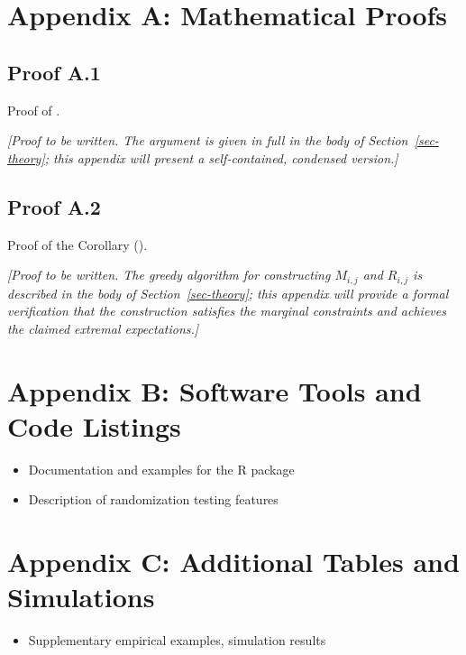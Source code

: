 \documentclass[
  12pt,
]{article}
\providecommand{\tightlist}{%
  \setlength{\itemsep}{0pt}\setlength{\parskip}{0pt}}
\theoremstyle{plain}
\theoremstyle{definition}
\theoremstyle{remark}
\begin{document}
\printbibliography[heading=none]

\newpage

\appendix

\section{Appendix A: Mathematical
Proofs}\label{appendix-a-mathematical-proofs}

\subsection{Proof A.1}\label{proof-max-product}

Proof of \textcite{prop-max-product}.

\emph{{[}Proof to be written. The argument is given in full in the body
of Section~\ref{sec-theory}; this appendix will present a
self-contained, condensed version.{]}}

\subsection{Proof A.2}\label{proof-cor-min}

Proof of the Corollary (\textcite{corr-min}).

\emph{{[}Proof to be written. The greedy algorithm for constructing
\(M_{i,j}\) and \(R_{i,j}\) is described in the body of
Section~\ref{sec-theory}; this appendix will provide a formal
verification that the construction satisfies the marginal constraints
and achieves the claimed extremal expectations.{]}}

\section{Appendix B: Software Tools and Code
Listings}\label{appendix-b-software-tools-and-code-listings}

\begin{itemize}
\tightlist
\item
  Documentation and examples for the R package\\
\item
  Description of randomization testing features
\end{itemize}

\section{Appendix C: Additional Tables and
Simulations}\label{appendix-c-additional-tables-and-simulations}

\begin{itemize}
\tightlist
\item
  Supplementary empirical examples, simulation results
\end{itemize}
\end{document}
